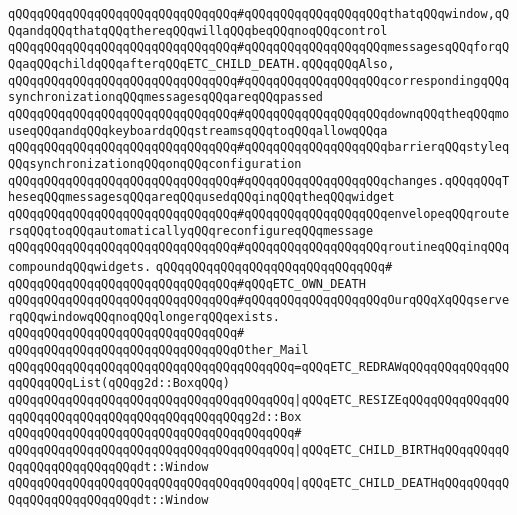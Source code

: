 \verb|qQQqqQQqqQQqqQQqqQQqqQQqqQQqqQQq#qQQqqQQqqQQqqQQqqQQqthatqQQqwindow,qQQqandqQQqthatqQQqthereqQQqwillqQQqbeqQQqnoqQQqcontrol|\newline
\verb|qQQqqQQqqQQqqQQqqQQqqQQqqQQqqQQq#qQQqqQQqqQQqqQQqqQQqmessagesqQQqforqQQqaqQQqchildqQQqafterqQQqETC_CHILD_DEATH.qQQqqQQqAlso,|\newline
\verb|qQQqqQQqqQQqqQQqqQQqqQQqqQQqqQQq#qQQqqQQqqQQqqQQqqQQqcorrespondingqQQqsynchronizationqQQqmessagesqQQqareqQQqpassed|\newline
\verb|qQQqqQQqqQQqqQQqqQQqqQQqqQQqqQQq#qQQqqQQqqQQqqQQqqQQqdownqQQqtheqQQqmouseqQQqandqQQqkeyboardqQQqstreamsqQQqtoqQQqallowqQQqa|\newline
\verb|qQQqqQQqqQQqqQQqqQQqqQQqqQQqqQQq#qQQqqQQqqQQqqQQqqQQqbarrierqQQqstyleqQQqsynchronizationqQQqonqQQqconfiguration|\newline
\verb|qQQqqQQqqQQqqQQqqQQqqQQqqQQqqQQq#qQQqqQQqqQQqqQQqqQQqchanges.qQQqqQQqTheseqQQqmessagesqQQqareqQQqusedqQQqinqQQqtheqQQqwidget|\newline
\verb|qQQqqQQqqQQqqQQqqQQqqQQqqQQqqQQq#qQQqqQQqqQQqqQQqqQQqenvelopeqQQqroutersqQQqtoqQQqautomaticallyqQQqreconfigureqQQqmessage|\newline
\verb|qQQqqQQqqQQqqQQqqQQqqQQqqQQqqQQq#qQQqqQQqqQQqqQQqqQQqroutineqQQqinqQQqcompoundqQQqwidgets.|\newline
\verb|qQQqqQQqqQQqqQQqqQQqqQQqqQQqqQQq#|\newline
\verb|qQQqqQQqqQQqqQQqqQQqqQQqqQQqqQQq#qQQqETC_OWN_DEATH|\newline
\verb|qQQqqQQqqQQqqQQqqQQqqQQqqQQqqQQq#qQQqqQQqqQQqqQQqqQQqOurqQQqXqQQqserverqQQqwindowqQQqnoqQQqlongerqQQqexists.|\newline
\verb|qQQqqQQqqQQqqQQqqQQqqQQqqQQqqQQq#|\newline
\verb|qQQqqQQqqQQqqQQqqQQqqQQqqQQqqQQqOther_Mail|\newline
\verb|qQQqqQQqqQQqqQQqqQQqqQQqqQQqqQQqqQQqqQQq=qQQqETC_REDRAWqQQqqQQqqQQqqQQqqQQqqQQqList(qQQqg2d::BoxqQQq)|\newline
\verb|qQQqqQQqqQQqqQQqqQQqqQQqqQQqqQQqqQQqqQQq|\verb#|qQQqETC_RESIZEqQQqqQQqqQQqqQQqqQQqqQQqqQQqqQQqqQQqqQQqqQQqqQQqg2d::Box#\newline
\verb|qQQqqQQqqQQqqQQqqQQqqQQqqQQqqQQqqQQqqQQq#|\newline
\verb|qQQqqQQqqQQqqQQqqQQqqQQqqQQqqQQqqQQqqQQq|\verb#|qQQqETC_CHILD_BIRTHqQQqqQQqqQQqqQQqqQQqqQQqqQQqdt::Window#\newline
\verb|qQQqqQQqqQQqqQQqqQQqqQQqqQQqqQQqqQQqqQQq|\verb#|qQQqETC_CHILD_DEATHqQQqqQQqqQQqqQQqqQQqqQQqqQQqdt::Window#\newline
